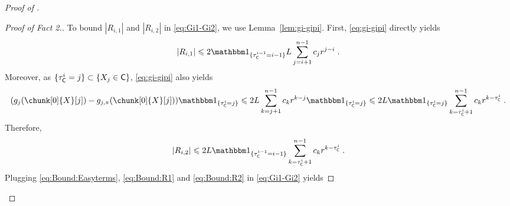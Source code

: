 \documentclass[leqno,11pt,a4paper]{article}
\begin{document}
\begin{proof}[Proof of ]
\begin{proof}[Proof of Fact 2.]
To bound $|R_{i,1}|$ and $|R_{i,2}|$ in \eqref{eq:Gi1-Gi2}, we use Lemma~\ref{lem:gi-gipi}.
First, \eqref{eq:gi-gipi} directly yields
\begin{equation}\label{eq:Bound:R1}
|R_{i,1}|\leqslant 2\indiacc{\tau_{\cC}^{i-1}=i-1}L\sum_{j=i+1}^{n-1}c_jr^{j-i}\eqsp.
\end{equation}
Moreover, as $\{\tau_{\mathsf{C}}^i=j\}\subset \{X_j\in \mathsf{C}\}$, \eqref{eq:gi-gipi} also yields
\[
(g_j(\chunk[0]{X}[j])-g_{j,\pi}(\chunk[0]{X}[j]))\indiacc{\tau_{\cC}^i=j}\leqslant 2L\sum_{k=j+1}^{n-1}c_kr^{k-j}\indiacc{\tau_{\cC}^i=j}\leqslant 2L\indiacc{\tau_{\cC}^i=j}\sum_{k=\tau_{\cC}^i+1}^{n-1}c_kr^{k-\tau_{\cC}^i}\eqsp.
\]
Therefore,
\begin{equation}\label{eq:Bound:R2}
|R_{i,2}|\leqslant 2L\indiacc{\tau_{\cC}^{i-1}=i-1}\sum_{k=\tau_{\cC}^i+1}^{n-1}c_kr^{k-\tau_{\cC}^i}\eqsp.
\end{equation}
Plugging \eqref{eq:Bound:Easyterms}, \eqref{eq:Bound:R1} and \eqref{eq:Bound:R2} in \eqref{eq:Gi1-Gi2} yields

\end{proof}
\end{proof}
\end{document}
